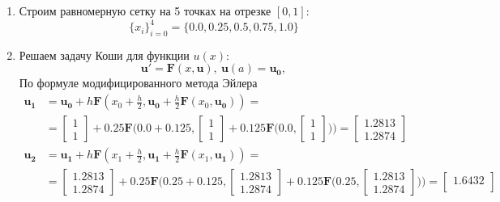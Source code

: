 \documentclass[a4paper, 12pt]{article}
\begin{document}
	\begin{enumerate}
		\item Строим равномерную сетку на 5 точках на отрезке $[0,1]$:
			\begin{equation*}
				\{x_i\}_{i=0}^4=\{0.0, 0.25, 0.5, 0.75, 1.0\}
			\end{equation*}
		\item Решаем задачу Коши для функции $u(x)$:
			\begin{equation*}
				\mathbf{u'}=\mathbf{F}(x,\mathbf{u}), \ \mathbf{u}(a)=\mathbf{u_0},
			\end{equation*}
			По формуле модифицированного метода Эйлера
			\begin{align*}
				\mathbf{u_1}&=\mathbf{u_0} + h\mathbf{F}(x_0 + \frac{h}{2}, \mathbf{u_0}+\frac{h}{2}\mathbf{F}(x_0,\mathbf{u_0}))=\\&=
				\begin{bmatrix}
					1\\
					1
				\end{bmatrix} + 0.25\mathbf{F}\bigg(0.0 + 0.125, 
				\begin{bmatrix}
					1\\
					1
				\end{bmatrix} + 0.125\mathbf{F}\bigg(0.0, 
				\begin{bmatrix}
					1\\
					1
				\end{bmatrix}\bigg)\bigg)=
				\begin{bmatrix}
					1.2813\\
					1.2874
				\end{bmatrix}\\
				\mathbf{u_2}&=\mathbf{u_1} + h\mathbf{F}(x_1 + \frac{h}{2}, \mathbf{u_1}+\frac{h}{2}\mathbf{F}(x_1,\mathbf{u_1}))=\\&=
				\begin{bmatrix}
					1.2813\\
					1.2874
				\end{bmatrix} + 0.25\mathbf{F}\bigg(0.25 + 0.125, 
				\begin{bmatrix}
					1.2813\\
					1.2874
				\end{bmatrix} + 0.125\mathbf{F}\bigg(0.25, 
				\begin{bmatrix}
					1.2813\\
					1.2874
				\end{bmatrix}\bigg)\bigg)=
				\begin{bmatrix}
					1.6432\\

\end{bmatrix}
\end{align*}
\end{enumerate}
\end{document}
